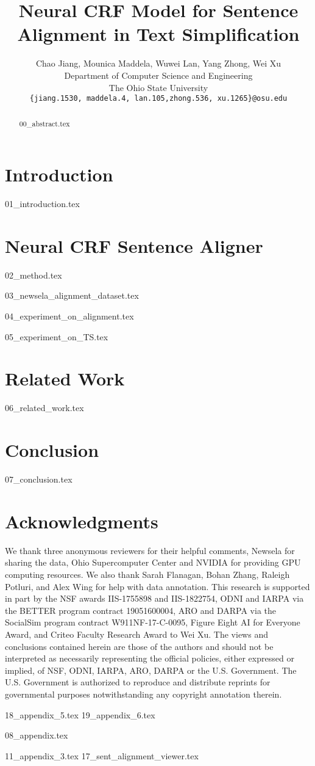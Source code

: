 \documentclass[11pt,a4paper]{article}
\title{Neural CRF Model for Sentence Alignment in Text Simplification}
\author{Chao Jiang, Mounica Maddela, Wuwei Lan, Yang Zhong, Wei Xu \\
Department of Computer Science and Engineering\\ 
The Ohio State University\\
  \texttt{\{jiang.1530,  maddela.4, lan.105,zhong.536, xu.1265\}@osu.edu}
}
\date{}
\begin{document}
\maketitle


\begin{abstract}
{00_abstract.tex}
\end{abstract}

\section{Introduction}
{01_introduction.tex}


\section{Neural CRF Sentence Aligner}
{02_method.tex}


{03_newsela_alignment_dataset.tex}


{04_experiment_on_alignment.tex}



{05_experiment_on_TS.tex}

\section{Related Work}
{06_related_work.tex}

\section{Conclusion}
{07_conclusion.tex}


\section*{Acknowledgments}

We thank three anonymous
reviewers for their helpful comments, Newsela for sharing the data, Ohio Supercomputer Center \cite{Oakley2012} and NVIDIA for providing GPU computing resources. We also thank Sarah Flanagan, Bohan Zhang, Raleigh Potluri, and Alex Wing for help with data annotation. This research is supported in part by the NSF awards IIS-1755898 and IIS-1822754, ODNI and IARPA via the BETTER program contract 19051600004, ARO and DARPA via the SocialSim program contract W911NF-17-C-0095, Figure Eight AI for Everyone Award, and Criteo Faculty Research Award to Wei Xu. The views and conclusions contained herein are those of the authors and should not be interpreted as necessarily representing the official policies, either expressed or implied, of NSF, ODNI, IARPA, ARO, DARPA or the U.S. Government. The U.S. Government is authorized to reproduce and distribute reprints for governmental purposes notwithstanding any copyright annotation therein.

\newpage




\clearpage

\appendix


{18_appendix_5.tex}
{19_appendix_6.tex}

{08_appendix.tex}

{11_appendix_3.tex}
{17_sent_alignment_viewer.tex}
\end{document}
